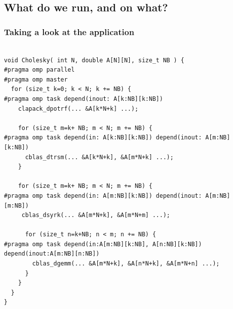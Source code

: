 \documentclass[xcolor={usenames,dvipsnames,svgnames,table}, aspectratio=43]{beamer}
\begin{document}
\subsection{What do we run, and on what?}




\begin{frame}[fragile]
\frametitle{Taking a look at the application}


    \begin{lstlisting}

void Cholesky( int N, double A[N][N], size_t NB ) {
#pragma omp parallel
#pragma omp master
  for (size_t k=0; k < N; k += NB) {
#pragma omp task depend(inout: A[k:NB][k:NB])
    clapack_dpotrf(... &A[k*N+k] ...);
                                                                  
    for (size_t m=k+ NB; m < N; m += NB) {
#pragma omp task depend(in: A[k:NB][k:NB]) depend(inout: A[m:NB][k:NB])
      cblas_dtrsm(... &A[k*N+k], &A[m*N+k] ...);
    }
     
    for (size_t m=k+ NB; m < N; m += NB) {
#pragma omp task depend(in: A[m:NB][k:NB]) depend(inout: A[m:NB][m:NB])
     cblas_dsyrk(... &A[m*N+k], &A[m*N+m] ...);

      for (size_t n=k+NB; n < m; n += NB) {
#pragma omp task depend(in:A[m:NB][k:NB], A[n:NB][k:NB]) depend(inout:A[m:NB][n:NB])
        cblas_dgemm(... &A[m*N+k], &A[n*N+k], &A[m*N+n] ...);
      }
    }
  }
}
\end{lstlisting}
\end{frame}
\end{document}
